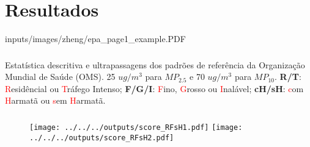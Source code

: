 \section{Resultados}

inputs/images/zheng/epa_page1_example.PDF
\begin{frame}
  \frametitle{}
  \begin{table}
    
    \caption{Estatística descritiva e ultrapassagens dos padrões de referência 
             da Organização Mundial de Saúde (OMS). 
            25 $ug/m^3$ para $MP_{2.5}$ e 70 $ug/m^3$ para $MP_{10}$.
           \textbf{R/T}: \textcolor{red}{R}esidêncial ou \textcolor{red}{T}ráfego Intenso; 
           \textbf{F/G/I}: \textcolor{red}{F}ino, \textcolor{red}{G}rosso ou \textcolor{red}{I}nalável; 
           \textbf{cH/sH}: \textcolor{red}{c}om \textcolor{red}{H}armatã ou \textcolor{red}{s}em \textcolor{red}{H}armatã.}
  \end{table}

\end{frame}

\begin{frame}
  \frametitle{}
    
\end{frame}

\begin{frame}
  \frametitle{}
  \begin{figure}[H]
   \centering
    \texttt{[image: ../../../outputs/score\_RFsH1.pdf]}
    \texttt{[image: ../../../outputs/score\_RFsH2.pdf]}
  \end{figure}
\end{frame}

\begin{frame}
  \frametitle{}
    
\end{frame}

\begin{frame}
  \frametitle{}
    
\end{frame}

\begin{frame}
  \frametitle{}
    
\end{frame}
